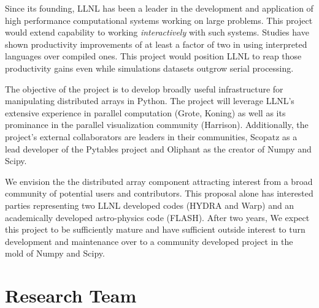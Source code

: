 \documentclass[letterpaper,12pt]{article}
\begin{document}
Since its founding, LLNL has been a leader in the development and application of high performance computational systems working on large problems.  This project would extend capability to working \emph{interactively} with such systems.  Studies have shown productivity improvements of at least a factor of two\cite{Prechelt2000} in using interpreted languages over compiled ones.  This project would position LLNL to reap those productivity gains even while simulations datasets outgrow serial processing.

The objective of the project is to develop broadly useful infrastructure for manipulating distributed arrays in Python.  The project will leverage LLNL's extensive experience in parallel computation (Grote, Koning) as well as its prominance in the parallel visualization community (Harrison).  Additionally, the project's external collaborators are leaders in their communities, Scopatz as a lead developer of the Pytables project and Oliphant as the creator of Numpy and Scipy.

We envision the the distributed array component attracting interest from a broad community of potential users and contributors.  This proposal alone has interested parties representing two LLNL developed codes (HYDRA and Warp) and an academically developed astro-physics code (FLASH).  After two years, We expect this project to be sufficiently mature and have sufficient outside interest to turn development and maintenance over to a community developed project in the mold of Numpy and Scipy.



\section*{Research Team}
\end{document}
